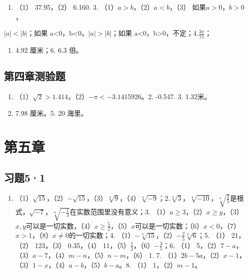 \begin{enumerate}[start=2]
\item
  （1） 37.95，（2） 6.160. 3. （1）\(a > b\)，（2）\(a < b\)，（3）
  如果\(a > 0\)，\(b > 0\)，
\end{enumerate}

\(|a|<|b|\)；如果 a\textless0，b\textless0，\(|a|>|b|\)；如果
a\textless0，b\textgreater0，不定；4.\(\frac{3\pi}{75}\)；

\begin{enumerate}[start=5]
\item
  4.92 厘米；6. 6.3 倍。
\end{enumerate}

\subsection{第四章测验题}

\begin{enumerate}
\item
  （1）\(\sqrt{2} > 1.414\)，（2）\(-\pi < -3.1415926\)。2. -0.547. 3.
  1.32米。
\item
  7.98 厘米。5. 20 海里。
\end{enumerate}

\section{第五章}

\subsection{习题5·1}

\begin{enumerate}
\item
  （1）\(\sqrt{15}\)，（2）\(-\sqrt{15}\)，（3）\(\sqrt[4]{9}\)，（4）\(\sqrt[4]{-9}\)；2.\(\sqrt[4]{3}\)，\(\sqrt[4]{-10}\)，\(\sqrt[4]{\frac{2}{5}}\)是根式，\(\sqrt{-7}\)，\(\sqrt[4]{-\frac{1}{3}}\)在实数范围里没有意义；3.
  （1）\(a \geqslant 3\)，（2）\(x \geqslant y\)，（3）\(x, y\)可以是一切实数，（4）\(x \geqslant \frac{5}{2}\)，（5）\(x\)可以是一切实数；（6）\(x < 0\)，（7）\(x > 1\)，（8）\(x \neq 0\)的一切实数；4.
  （1）\(-\sqrt[3]{15}\)，（2）\(-\frac{2}{5}\sqrt[3]{6}\)；5. （1）
  21，（2） 123，（3） 0.35，（4）
  11，（5）\(\frac{1}{2}\)，（6）\(-\frac{3}{5}\)；6. （1）
  5，（2）\(7 - a\)，（3）\(a - 7\)，（4）\(m - n\)，（5）\(n - m\)，（6）
  1. 7.
  （1）\(2b - 5a\)，（2）\(x - 1\)，（3）\(1 - x\)，（4）\(a - b\)，（5）\(b - a\)。8.
  （1） 1，（2）\(m - 1\)。
\end{enumerate}

